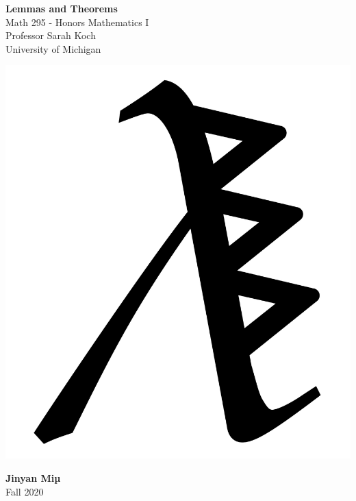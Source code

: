 \documentclass[11pt]{article}
\theoremstyle{break}
\theoremstyle{break}
\begin{document}
	\begin{titlepage}
		\begin{center}
			\vspace*{\fill}
			\Huge \color{red}
				\textbf{Lemmas and Theorems}\\
			\vspace{0.5cm}			
			\Large \color{black}
				Math 295 - Honors Mathematics I\\
				Professor Sarah Koch\\		
				University of Michigan\\
			\vspace{3cm}
			
			\includegraphics[scale=0.19]{spikyLambdaPazo.pdf}
			
			\vspace{5cm}
			\LARGE
				\textbf{Jinyan Miµ}\\
				Fall 2020\\
			\vspace{5cm}

		\vspace*{\fill}
		\end{center}			
	\end{titlepage}
\end{document}
